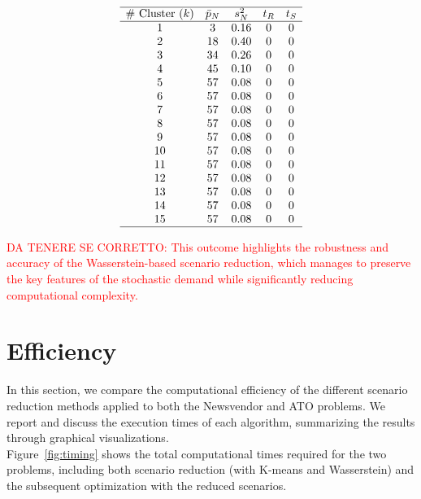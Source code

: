 \documentclass[a4paper,12pt]{article}
\begin{document}
	\[
	\begin{array}{ccccc}
		\hline
		\text{\# Cluster $(k)$} & \text{$\bar{p}_{N}$} & \text{$s_{N}^{2}$} & \text{$t_{R}$} & \text{$t_{S}$}\\
		\hline
		1 & 3 & 0.16 & 0 & 0\\
		2 & 18 & 0.40 & 0 & 0\\
		3 & 34 & 0.26 & 0 & 0\\
		4 & 45 & 0.10 & 0 & 0\\
		5 & 57 & 0.08 & 0 & 0\\
		6 & 57 & 0.08 & 0 & 0\\
		7 & 57 & 0.08 & 0 & 0\\
		8 & 57 & 0.08 & 0 & 0\\
		9 & 57 & 0.08 & 0 & 0\\
		10 & 57 & 0.08 & 0 & 0\\
		11 & 57 & 0.08 & 0 & 0\\
		12 & 57& 0.08 & 0 & 0\\
		13 & 57 & 0.08 & 0 & 0\\
		14 & 57 & 0.08 & 0 & 0\\
		15 & 57 & 0.08 & 0 & 0\\
		\hline
	\end{array}
	\]
	
	\label{tab:wass-ato-results}
	
	
	 \textcolor{red}{DA TENERE SE CORRETTO: This outcome highlights the robustness and accuracy of the Wasserstein-based scenario reduction, which manages to preserve the key features of the stochastic demand while significantly reducing computational complexity.
	 }
	 
	 \newpage	
	\section{Efficiency}
	
	In this section, we compare the computational efficiency of the different scenario reduction methods applied to both the Newsvendor and ATO problems. We report and discuss the execution times of each algorithm, summarizing the results through graphical visualizations.\\
	
	\noindent Figure~\ref{fig:timing} shows the total computational times required for the two problems, including both scenario reduction (with K-means and Wasserstein) and the subsequent optimization with the reduced scenarios.
	
\end{document}
